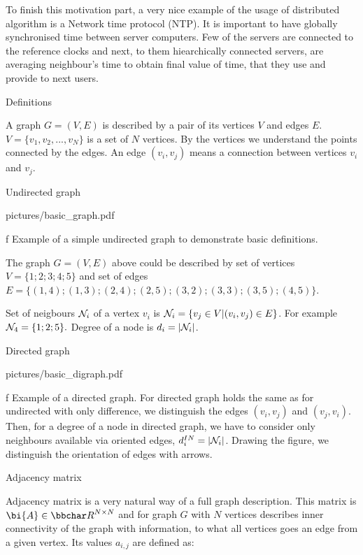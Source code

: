 To finish this motivation part, a very nice example of the usage of distributed algorithm is a Network time protocol (NTP). It is important to have globally synchronised time between server computers. Few of the servers are connected to the reference clocks and next, to them hiearchically connected servers, are averaging neighbour's time to obtain final value of time, that they use and provide to next users.


\sec Definitions

A graph $G=(V, E)$ is described by a pair of its vertices $V$ and edges $E$. ${V=\{ v_1, v_2, ..., v_N \}}$ is a set of $N$ vertices. By the vertices we understand the points connected by the edges. 
An edge $\left( v_i, v_j \right)$ means a connection between vertices $v_i$ and $v_j$.

\secc Undirected graph

\midinsert
\picw=6cm \cinspic pictures/basic_graph.pdf
\caption/f Example of a simple undirected graph to demonstrate basic definitions. 
\endinsert

The graph $G=(V, E)$ above could be described by set of vertices ${V=\{ 1; 2; 3; 4; 5\}}$ and set of edges  $E=\{ (1, 4); (1, 3); (2, 4); (2,5); (3, 2); (3, 3); (3, 5); (4, 5) \}$.

Set of neigbours $ {\cal{N}}_i $ of a vertex $v_i$ is $ {\cal{N}}_i = \{ v_j \in V | (v_i , v_j)\in E \} $. For example $ {\cal{N}}_4 = \{1; 2; 5 \} .$ Degree of a node is  $d_i= |{\cal{N}}_i |$.

\secc Directed graph

\midinsert
\picw=7cm \cinspic pictures/basic_digraph.pdf
\caption/f Example of a directed graph. 
\endinsert
For directed graph holds the same as for undirected with only difference, we distinguish the edges 
$ ( v_i, v_j ) $ and $ ( v_j, v_i ) . $ Then, for a degree of a node in directed graph, we have to consider only neighbours available via oriented edges,  $d_i^{IN}= |{\cal{N}}_i |$. Drawing the figure, we distinguish the orientation of edges with arrows.




\secc Adjacency matrix 

Adjacency matrix is a very natural way of a full graph description. This matrix is ${\bi{A}} \in {\bbchar R}^{N\times{N}}$ and for graph $G$ with $N$ vertices describes inner connectivity of the graph with information, to what all vertices goes an edge from a given vertex.  Its values $a_{i,j}$ are defined as: 



